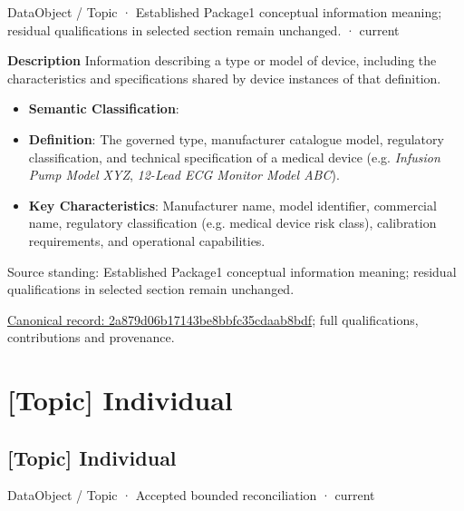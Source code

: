 \label{element:2a879d06b17143be8bbfc35cdaab8bdf}
{\small DataObject / Topic · Established Package1 conceptual information meaning; residual qualifications in selected section remain unchanged. · current}\par

\textbf{Description}
Information describing a type or model of device, including the characteristics and specifications shared by device instances of that definition.



\begin{itemize}


\item \textbf{Semantic Classification}: \texttt{}

\item \textbf{Definition}: The governed type, manufacturer catalogue model, regulatory classification, and technical specification of a medical device (e.g. \emph{Infusion Pump Model XYZ}, \emph{12-Lead ECG Monitor Model ABC}).

\item \textbf{Key Characteristics}: Manufacturer name, model identifier, commercial name, regulatory classification (e.g. medical device risk class), calibration requirements, and operational capabilities.

\end{itemize}


Source standing: Established Package1 conceptual information meaning; residual qualifications in selected section remain unchanged.


{\footnotesize \href{../../../../continuum/application/data-object/topic/2a879d06b17143be8bbfc35cdaab8bdf.md}{Canonical record: 2a879d06b17143be8bbfc35cdaab8bdf}; full qualifications, contributions and provenance.}\par
\section{[Topic] Individual}

\subsection{[Topic] Individual}

\label{element:4af969b8c23a4dcab7569dc51b263383}
{\small DataObject / Topic · Accepted bounded reconciliation · current}\par

